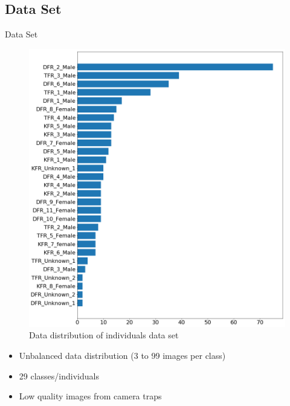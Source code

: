 \documentclass[10pt]{beamer}
\begin{document}
\subsection{Data Set}
\begin{frame}{Data Set}
	\begin{minipage}[c]{0.48\linewidth}
		\centering
		\begin{figure}
			\includegraphics[width=\linewidth,height=.8\textheight,keepaspectratio]{images/Data_dist_leo_v2.png}
			\caption{Data distribution of individuals data set}
		\end{figure}
	\end{minipage}
	\hfill
	\begin{minipage}[c]{0.48\linewidth}
		\begin{itemize}
			\item Unbalanced data distribution (3 to 99 images per class)
			\item 29 classes/individuals
			\item Low quality images from camera traps
		\end{itemize}
	\end{minipage}
\end{frame}
\end{document}
